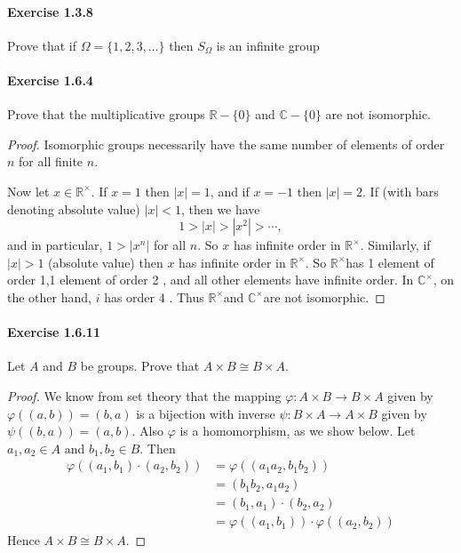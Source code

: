\documentclass{article}
\theoremstyle{definition}
\begin{document}
\paragraph{Exercise 1.3.8} Prove that if $\Omega=\{1,2,3, \ldots\}$ then $S_{\Omega}$ is an infinite group


\paragraph{Exercise 1.6.4} Prove that the multiplicative groups $\mathbb{R}-\{0\}$ and $\mathbb{C}-\{0\}$ are not isomorphic.
\begin{proof}
    Isomorphic groups necessarily have the same number of elements of order $n$ for all finite $n$.

Now let $x \in \mathbb{R}^{\times}$. If $x=1$ then $|x|=1$, and if $x=-1$ then $|x|=2$. If (with bars denoting absolute value) $|x|<1$, then we have
$$
1>|x|>\left|x^2\right|>\cdots,
$$
and in particular, $1>\left|x^n\right|$ for all $n$. So $x$ has infinite order in $\mathbb{R}^{\times}$.
Similarly, if $|x|>1$ (absolute value) then $x$ has infinite order in $\mathbb{R}^{\times}$. So $\mathbb{R}^{\times}$has 1 element of order 1,1 element of order 2 , and all other elements have infinite order.
In $\mathbb{C}^{\times}$, on the other hand, $i$ has order 4 . Thus $\mathbb{R}^{\times}$and $\mathbb{C}^{\times}$are not isomorphic.
\end{proof}



\paragraph{Exercise 1.6.11} Let $A$ and $B$ be groups. Prove that $A \times B \cong B \times A$.
\begin{proof}
    We know from set theory that the mapping $\varphi: A \times B \rightarrow B \times A$ given by $\varphi((a, b))=(b, a)$ is a bijection with inverse $\psi: B \times A \rightarrow A \times B$ given by $\psi((b, a))=(a, b)$. Also $\varphi$ is a homomorphism, as we show below.
Let $a_1, a_2 \in A$ and $b_1, b_2 \in B$. Then
$$
\begin{aligned}
\varphi\left(\left(a_1, b_1\right) \cdot\left(a_2, b_2\right)\right) &=\varphi\left(\left(a_1 a_2, b_1 b_2\right)\right) \\
&=\left(b_1 b_2, a_1 a_2\right) \\
&=\left(b_1, a_1\right) \cdot\left(b_2, a_2\right) \\
&=\varphi\left(\left(a_1, b_1\right)\right) \cdot \varphi\left(\left(a_2, b_2\right)\right)
\end{aligned}
$$
Hence $A \times B \cong B \times A$.
\end{proof}
\end{document}
